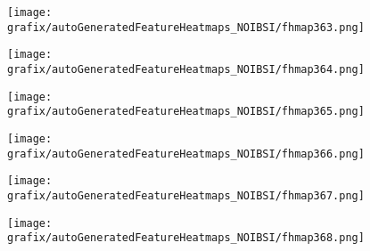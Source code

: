\hspace{\hsp} 
\begin{subfigure}{\wid\textwidth} 
    \centering 
    \caption{\tiny \sffamily {}} 
    \vspace{\vsp} 
    \texttt{[image: grafix/autoGeneratedFeatureHeatmaps\_NOIBSI/fhmap363.png]} 
\end{subfigure} 
\hspace{\hsp} 
\begin{subfigure}{\wid\textwidth} 
    \centering 
    \caption{\tiny \sffamily {}} 
    \vspace{\vsp} 
    \texttt{[image: grafix/autoGeneratedFeatureHeatmaps\_NOIBSI/fhmap364.png]} 
\end{subfigure} 
\hspace{\hsp} 
\begin{subfigure}{\wid\textwidth} 
    \centering 
    \caption{\tiny \sffamily {}} 
    \vspace{\vsp} 
    \texttt{[image: grafix/autoGeneratedFeatureHeatmaps\_NOIBSI/fhmap365.png]} 
\end{subfigure} 
\hspace{\hsp} 
\begin{subfigure}{\wid\textwidth} 
    \centering 
    \caption{\tiny \sffamily {}} 
    \vspace{\vsp} 
    \texttt{[image: grafix/autoGeneratedFeatureHeatmaps\_NOIBSI/fhmap366.png]} 
\end{subfigure} 
\hspace{\hsp} 
\begin{subfigure}{\wid\textwidth} 
    \centering 
    \caption{\tiny \sffamily {}} 
    \vspace{\vsp} 
    \texttt{[image: grafix/autoGeneratedFeatureHeatmaps\_NOIBSI/fhmap367.png]} 
\end{subfigure} 
\hspace{\hsp} 
\begin{subfigure}{\wid\textwidth} 
    \centering 
    \caption{\tiny \sffamily {}} 
    \vspace{\vsp} 
    \texttt{[image: grafix/autoGeneratedFeatureHeatmaps\_NOIBSI/fhmap368.png]} 
\end{subfigure} 
\hspace{\hsp} 
